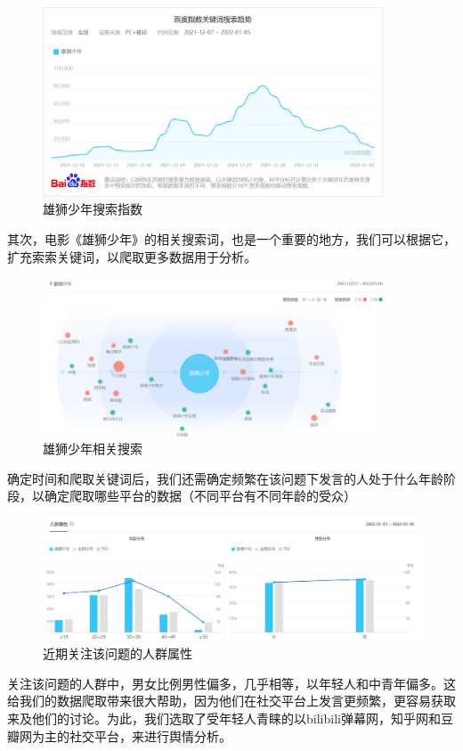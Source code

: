 \documentclass[12pt,a4paper,utf8]{article}
\begin{document}
\begin{figure}[H]
    \centering
    \includegraphics[width=0.9\textwidth]{images/百度指数.png}  
    \caption{雄狮少年搜索指数} 
\end{figure}  

其次，电影《雄狮少年》的相关搜索词，也是一个重要的地方，我们可以根据它，扩充索索关键词，以爬取更多数据用于分析。
\begin{figure}[H]
    \centering
    \includegraphics[width=0.9\textwidth]{images/相关搜索.png}  
    \caption{雄狮少年相关搜索} 
\end{figure}  

确定时间和爬取关键词后，我们还需确定频繁在该问题下发言的人处于什么年龄阶段，以确定爬取哪些平台的数据（不同平台有不同年龄的受众）
\begin{figure}[H]
    \centering
    \includegraphics[width=1\textwidth]{images/人群属性.png}  
    \caption{近期关注该问题的人群属性} 
\end{figure}  
关注该问题的人群中，男女比例男性偏多，几乎相等，以年轻人和中青年偏多。这给我们的数据爬取带来很大帮助，因为他们在社交平台上发言更频繁，更容易获取来及他们的讨论。为此，我们选取了受年轻人青睐的以bilibili弹幕网，知乎网和豆瓣网为主的社交平台，来进行舆情分析。
\end{document}
